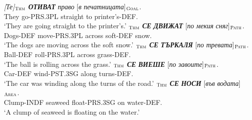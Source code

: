 \documentclass[output=paper,colorlinks,citecolor=brown]{langscibook}
\begin{document}
\begin{exe}
\ex \label{ex:02} 
\gll \emph{[Те]}$_{\text{\textsc{Thm}}}$ \textit{\textbf{ОТИВАТ}} \textit{право} [\textit{в} \textit{печатницата}]$_{\text{\textsc{Goal}}}$. \\
They go-PRS.3PL straight to printer's-DEF. \\
\glt `They are going straight to the printer's.' 
\ex \label{ex:03} 
$_{\text{\textsc{Thm}}}$ {\textit{\textbf{СЕ}} \textit{\textbf{ДВИЖАТ}}} [\textit{по} \textit{мекия} \textit{сняг}]$_{\text{\textsc{Path}}}$. \\
Dogs-DEF move-PRS.3PL across soft-DEF snow. \\
\glt `The dogs are moving across the soft snow.' 
\ex \label{ex:04} 
$_{\text{\textsc{Thm}}}$ {\textit{\textbf{СЕ}} \textit{\textbf{ТЪРКАЛЯ}}} [\textit{по} \textit{тревата}]$_{\text{\textsc{Path}}}$. \\
Ball-DEF roll-PRS.3PL across grass-DEF. \\
\glt `The ball is rolling across the grass.' 
\ex \label{ex:05} 
$_{\text{\textsc{Thm}}}$ {\textit{\textbf{СЕ}} \textit{\textbf{ВИЕШЕ}}} [\textit{по} \textit{завоите}]$_{\text{\textsc{Path}}}$. \\
Car-DEF wind-PST.3SG along turns-DEF. \\
\glt `The car was winding along the turns of the road.'
\ex \label{ex:06} 
$_{\text{\textsc{Thm}}}$ {\textit{\textbf{СЕ}} \textit{\textbf{НОСИ}}} [\textit{във} \textit{водата}]$_{\text{\textsc{Area}}}$. \\
Clump-INDF seaweed float-PRS.3SG on water-DEF. \\
\glt `A clump of seaweed is floating on the water.' 
\end{exe}
\end{document}
